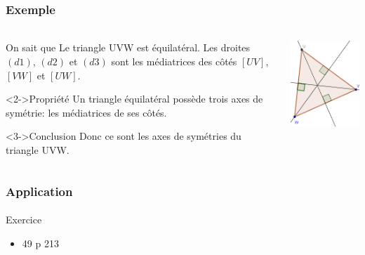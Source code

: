 \documentclass{beamer}
\begin{document}
\begin{frame}
	\frametitle{Exemple}  
	\framesubtitle{}
	
	\begin{columns}[c]
		
		
		\begin{column}{7.5cm}
			
			\begin{block}{On sait que}
				Le triangle UVW est équilatéral. Les droites $(d1)$, $(d2)$ et $(d3)$ sont les médiatrices des côtés $[UV]$, $[VW]$ et $[UW]$.
			\end{block}
			
			\begin{block}<2->{Propriété}
				Un triangle équilatéral possède trois axes de symétrie: les médiatrices de ses côtés.
			\end{block}
			
			\begin{block}<3->{Conclusion}
				Donc ce sont les axes de symétries du triangle UVW.
			\end{block}
			
		\end{column}
		
		\begin{column}{3cm}
			\includegraphics[scale=0.5]{./img/equilat}
		\end{column}
		
	\end{columns}
	
\end{frame}

\begin{frame}
	\frametitle{Application}  
	\framesubtitle{}
	
	\begin{block}{Exercice}
		\begin{itemize}
			\item 49 p 213
		\end{itemize}
	\end{block}
\end{frame}
\end{document}
